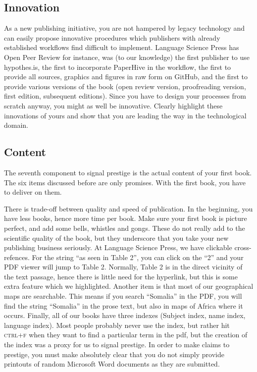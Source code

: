 \documentclass[guidelines,nonflat,modfonts] {langsci/langscibook}
\begin{document}
\subsection{Innovation}
As a new publishing initiative, you are not hampered by legacy technology and can easily propose innovative procedures which publishers with already established workflows find difficult to implement. Language Science Press has Open Peer Review for instance, was (to our knowledge) the first publisher to use hypothes.is, the first to incorporate PaperHive in the workflow, the first to provide all sources, graphics and figures in raw form on GitHub, and the first to provide various versions of the book (open review version, proofreading version, first edition, subsequent editions). Since you have to design your processes from scratch anyway, you might as well be innovative. Clearly highlight these innovations of yours and show that you are leading the way in the technological domain. 

 

\subsection{Content}
The seventh component to signal prestige is the actual content of your first book. The six items discussed before are only promises. With the first book, you have to deliver on them. 

There is trade-off between quality and speed of publication. In the beginning, you have less books, hence more time per book. Make sure your first book is picture perfect, and add some bells, whistles and gongs. These do not really add to the scientific quality of the book, but they underscore that you take your new publishing business seriously. At Language Science Press, we have clickable cross-refences. For the string ``as seen in Table 2'', you can click on the ``2'' and your PDF viewer will jump to Table 2. Normally, Table 2 is in the direct vicinity of the text passage, hence there is little need for the hyperlink, but this is some extra feature which we highlighted. Another item is that most of our geographical maps are searchable. This means if you search ``Somalia'' in the PDF, you will find the string ``Somalia'' in the prose text, but also in maps of Africa where it occurs. Finally, all of our books have three indexes (Subject index, name index, language index). Most people probably never use the index,  but rather hit \textsc{ctrl+f} when they want to find a particular term in the pdf, but the creation of the index was a proxy for us to signal prestige. In order to make claims to prestige, you must make absolutely clear that you do not simply provide printouts of random Microsoft Word documents as they are submitted. 
\end{document}
